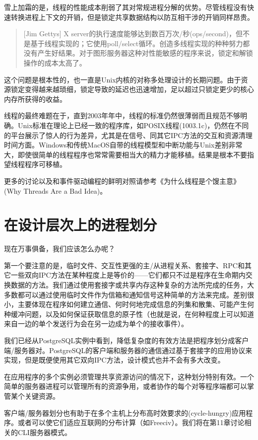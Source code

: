 \documentclass[12pt,oneside]{book}
\begin{document}
\begin{common-format}
雪上加霜的是，线程的性能成本削弱了其对常规进程分解的优势。尽管线程没有快速转换进程上下文的开销，但是锁定共享数据结构以防互相干涉的开销同样昂贵。

\begin{quote}[Jim Gettys]
X server的执行速度能够达到数百万次/秒(ops/second)，但不是基于线程实现的；它使用poll/select循环。创造多线程实现的种种努力都没有产生好结果。对于图形服务器这种对性能敏感的程序来说，锁定和解锁操作的成本太高了。
\end{quote}

这个问题是根本性的，也一直是Unix内核的对称多处理设计的长期问题。由于资源锁定变得越来越琐细，锁定导致的延迟也迅速增加，足以超过只锁定更少的核心内存所获得的收益。

线程的最终难题在于，直到2003年年中，线程的标准仍然很薄弱而且规范不够明确。Unix标准在理论上已经一致的程序库，如POSIX线程(1003.1c)，仍然在不同的平台展示了惊人的行为差异，尤其是在信号、同其它IPC方法的交互和资源清理时间方面。Windows和传统MacOS自带的线程模型和中断功能与Unix差别非常大，即使很简单的线程程序也常常需要相当大的精力才能移植。结果是根本不要指望线程程序可移植。

更多的讨论以及和事件驱动编程的鲜明对照请参考《为什么线程是个馊主意》(Why Threads Are a Bad Idea)\cite{Ousterhout96}。


\section{在设计层次上的进程划分}
现在万事俱备，我们应该怎么办呢？

第一个要注意的是，临时文件、交互性更强的主/从进程关系、套接字、RPC和其它一些双向IPC方法在某种程度上是等价的——它们都只不过是程序在生命期内交换数据的方法。我们通过使用套接字或共享内存这种复杂的方法所完成的任务，大多数都可以通过使用临时文件作为信箱和通知信号这种简单的方法来完成。差别很小，主要体现在程序如何建立通信、何时何地完成信息的列集和散集、可能产生何种缓冲问题，以及如何保证获取信息的原子性（也就是说，在何种程度上可以知道来自一边的单个发送行为会在另一边成为单个的接收事件）。

我们已经从PostgreSQL实例中看到，降低复杂度的有效方法是把程序划分成客户端/服务器对。PostgreSQL的客户端和服务器的通信通过基于套接字的应用协议来实现，但是既便使用其它双向IPC方法，设计模式也并不会有多大改变。

在应用程序的多个实例必须管理共享资源访问的情况下，这种划分特别有效。一个简单的服务器进程可以管理所有的资源争用，或者协作的每个对等程序端都可以掌管某个关键资源。

客户端/服务器划分也有助于在多个主机上分布高时效要求的(cycle-hungry)应用程序。或者可以使它们适应互联网的分布计算（如Freeciv）。我们将在第11章讨论相关的CLI服务器模式。


\end{common-format}
\end{document}
